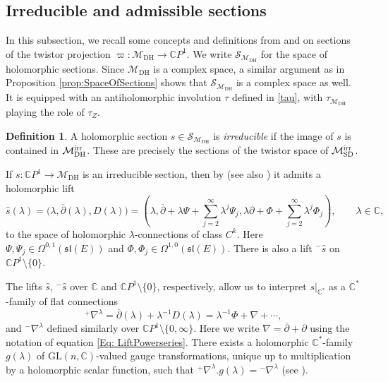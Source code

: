 \documentclass[pdftex]{sigma}
\numberwithin{equation}{section}
\theoremstyle{definition}
\newtheorem{Definition}[Theorem]{Definition}
\newcommand\C{{\mathbb C}}
\begin{document}
\subsection{Irreducible and admissible sections}

In this subsection, we recall some concepts and definitions from \cite{BHR} and \cite{BeHeRo} on
sections of the twistor projection $\varpi\colon \mathcal{M}_{\mathrm{DH}} \longrightarrow
\C P^1$. We write $\mathcal S_{\mathcal{M}_{\mathrm{DH}}}$ for
the space of holomorphic sections. Since $\mathcal{M}_{\mathrm{DH}}$ is a complex space, a similar argument as in
Proposition \ref{prop:SpaceOfSections} shows that $\mathcal{S}_{\mathcal{M}_{\mathrm{DH}}}$ is a complex space as
well. It is equipped with an antiholomorphic involution $\tau$ defined in \eqref{tau}, with
$\tau_{\mathcal{M}_{\mathrm{DH}}}$ playing the role of $\tau_Z$.

\begin{Definition} \label{Def: irred_section}
A holomorphic section $s \in \mathcal S_{\mathcal{M}_{\mathrm{DH}}}$ is \emph{irreducible} if the image of
$s$ is contained in $\mathcal{M}_{\mathrm{DH}}^{\rm irr}$.
These are precisely the sections of the twistor space of $\mathcal{M}_{\mathrm{SD}}^{\rm irr}$.
\end{Definition}

If $s\colon \C P^1 \longrightarrow \mathcal{M}_{\mathrm{DH}}$ is an irreducible section, then by
 \cite[Lemma 2.2]{BHR} (see also \cite[Remark~1.11]{BeHeRo}) it admits a holomorphic lift
\begin{equation} \label{Eq: LiftPowerseries}
\widehat s(\lambda) = \bigl(\lambda, \overline{\partial}(\lambda), D(\lambda)\bigr)
 = \left(\lambda, \overline\partial + \lambda\Psi+ \sum_{j=2}^\infty\lambda^j\Psi_j, \lambda\partial + \Phi
+ \sum_{j=2}^\infty\lambda^j\Phi_j\right), \qquad\lambda \in \C,
\end{equation}
to the space of holomorphic $\lambda$-connections of class $C^k$. Here
$\Psi, \Psi_j \in \Omega^{0,1}(\mathfrak{sl}(E))$ and $\Phi, \Phi_j \in \Omega^{1,0}(\mathfrak{sl}(E))$. There is
also a lift $^-\widehat s$ on $\mathbb CP^1\setminus\{0\}$.

The lifts $\widehat{s}$, $^-\widehat{s}$ over $\C$ and $\mathbb CP^1\setminus\{0\}$, respectively, allow us to interpret $s|_{\C^*}$ as a $\C^*$-family of flat connections
\[
^+\nabla^\lambda = \overline\partial(\lambda) + \lambda^{-1}D(\lambda) =
\lambda^{-1}\Phi +\nabla + \cdots ,
\]
and $^-\nabla^\lambda$ defined similarly over $\C P^1\setminus\{0, \infty\}$. Here we write
$\nabla = \overline\partial + \partial$ using the notation of equation
\eqref{Eq: LiftPowerseries}.
There exists a holomorphic $\C^*$-family $g(\lambda)$ of $\mathrm{GL}(n,\C)$-valued
gauge transformations, unique up to multiplication by a holomorphic scalar function,
such that $^+\nabla^\lambda.g(\lambda) = {}^-\nabla^\lambda$ (see \cite{BHR}).
\end{document}
